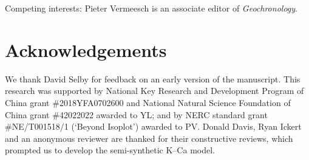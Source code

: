 \documentclass[]{article}
\begin{document}
Competing interests: {Pieter Vermeesch is an associate editor of \emph{Geochronology}.}\medskip


\section*{Acknowledgements}

  We thank David Selby for feedback on an early version of the
  manuscript. This research was supported by National Key Research and
  Development Program of China grant \#2018YFA0702600 and National
  Natural Science Foundation of China grant \#42022022 awarded to YL;
  and by NERC standard grant \#NE/T001518/1 (`Beyond Isoplot') awarded
  to PV. Donald Davis, Ryan Ickert and an anonymous reviewer are
  thanked for their constructive reviews, which prompted us to develop
  the semi-synthetic K--Ca model.



%
%
\end{document}
